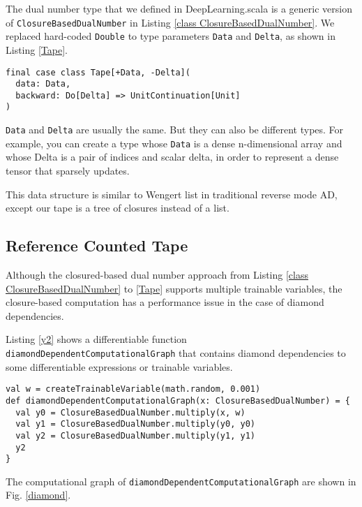 The dual number type that we defined in DeepLearning.scala is a generic version of \lstinline{ClosureBasedDualNumber} in Listing \ref{class ClosureBasedDualNumber}. We replaced hard-coded \lstinline{Double} to type parameters \lstinline{Data} and \lstinline{Delta}, as shown in Listing \ref{Tape}.

\begin{lstlisting}[float={htbp},caption={Generic closured-based monadic dual number}, label={Tape}]
final case class Tape[+Data, -Delta](
  data: Data,
  backward: Do[Delta] => UnitContinuation[Unit]
)
\end{lstlisting}

\lstinline{Data} and \lstinline{Delta} are usually the same. But they can also be different types. For example, you can create a type whose \lstinline{Data} is a dense n-dimensional array and whose {Delta} is a pair of indices and scalar delta, in order to represent a dense tensor that sparsely updates.

This data structure is similar to Wengert list in traditional reverse mode AD, except our tape is a tree of closures instead of a list.

\subsection{Reference Counted Tape}

Although the closured-based dual number approach from Listing \ref{class ClosureBasedDualNumber} to \ref{Tape} supports multiple \glspl{trainable variable}, the closure-based computation has a performance issue in the case of diamond dependencies.

Listing \ref{y2} shows a \gls{differentiable function} \lstinline{diamondDependentComputationalGraph} that contains diamond dependencies to some \glspl{differentiable expression} or \glspl{trainable variable}.

\begin{lstlisting}[float={htbp},caption={A diamond dependent \gls{differentiable function}}, label={y2}]
val w = createTrainableVariable(math.random, 0.001)
def diamondDependentComputationalGraph(x: ClosureBasedDualNumber) = {
  val y0 = ClosureBasedDualNumber.multiply(x, w)
  val y1 = ClosureBasedDualNumber.multiply(y0, y0)
  val y2 = ClosureBasedDualNumber.multiply(y1, y1)
  y2
}
\end{lstlisting}

The \gls{computational graph} of \lstinline{diamondDependentComputationalGraph} are shown in Fig. \ref{diamond}.

